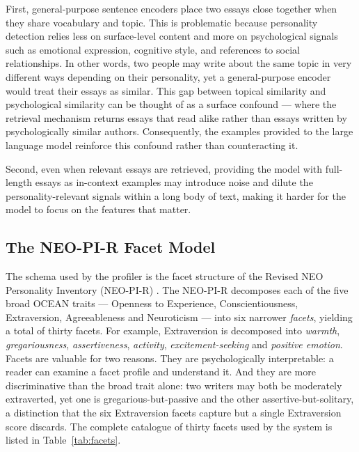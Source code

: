 \documentclass[../main.tex]{subfiles}
\begin{document}
First, general-purpose sentence encoders place two essays close together when they 
share vocabulary and topic. This is problematic because personality detection relies 
less on surface-level content and more on psychological signals such as emotional 
expression, cognitive style, and references to social relationships. In other words, 
two people may write about the same topic in very different ways depending on their 
personality, yet a general-purpose encoder would treat their essays as similar. 
This gap between topical similarity and psychological similarity can be thought of as 
a surface confound — where the retrieval mechanism returns essays that read alike 
rather than essays written by psychologically similar authors. Consequently, the 
examples provided to the large language model reinforce this confound rather than 
counteracting it.

Second, even when relevant essays are retrieved, providing the model with full-length 
essays as in-context examples may introduce noise and dilute the personality-relevant 
signals within a long body of text, making it harder for the model to focus on the 
features that matter.

\subsection{The NEO-PI-R Facet Model}
\label{subsec:neo-pi-r}
The schema used by the profiler is the facet structure of the Revised NEO
Personality Inventory (NEO-PI-R) \cite{costa2008revised}. The
NEO-PI-R decomposes each of the five broad OCEAN traits --- Openness to
Experience, Conscientiousness, Extraversion, Agreeableness and Neuroticism ---
into six narrower \emph{facets}, yielding a total of thirty facets. For
example, Extraversion is decomposed into \emph{warmth}, \emph{gregariousness},
\emph{assertiveness}, \emph{activity}, \emph{excitement-seeking} and
\emph{positive emotion}. Facets are valuable for two reasons. They are
psychologically interpretable: a reader can examine a facet profile and
understand it. And they are more discriminative than the broad trait alone: two
writers may both be moderately extraverted, yet one is gregarious-but-passive
and the other assertive-but-solitary, a distinction that the six Extraversion
facets capture but a single Extraversion score discards.
The complete catalogue of thirty facets used by the system is listed in
Table~\ref{tab:facets}.
\end{document}
